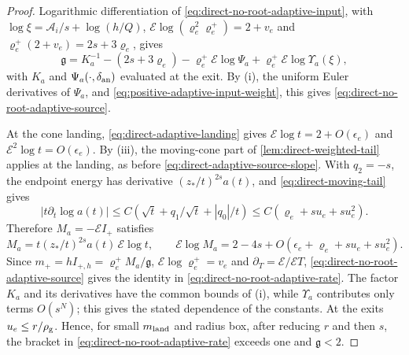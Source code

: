 \begin{proof}
Logarithmic differentiation of \eqref{eq:direct-no-root-adaptive-input},
with \(\log\xi=\mathcal A_i/s+\log(h/Q)\),
\(\mathcal E\log(\varrho_e^2\varrho_e^+)=2+v_e\) and
\(\varrho_e^+(2+v_e)=2s+3\varrho_e\), gives
\[
 \mathfrak g
 =K_a^{-1}-(2s+3\varrho_e)
       -\varrho_e^+\mathcal E\log\Psi_a
       +\varrho_e^+\mathcal E\log\Upsilon_a(\xi),
\]
with \(K_a\) and \(\Psi_a(\cdot,\delta_{\rm an})\) evaluated at the exit.
By (i), the uniform Euler derivatives of \(\Psi_a\), and
\eqref{eq:positive-adaptive-input-weight}, this gives
\eqref{eq:direct-no-root-adaptive-source}.

At the cone landing, \eqref{eq:direct-adaptive-landing} gives
\(\mathcal E\log t=2+O(\epsilon_e)\) and
\(\mathcal E^2\log t=O(\epsilon_e)\). By (iii), the moving-cone
part of \cref{lem:direct-weighted-tail} applies at the landing, as before
\eqref{eq:direct-adaptive-source-slope}. With \(q_2=-s\), the endpoint
energy has derivative \((z_*/t)^{2s}a(t)\), and
\eqref{eq:direct-moving-tail} gives
\[
 |t\partial_t\log a(t)|
   \le C(\sqrt t+q_1/\sqrt t+|q_0|/t)
   \le C(\varrho_e+su_e+su_e^2).
\]
Therefore \(M_a=-\mathcal EI_+\) satisfies
\[
 M_a=t(z_*/t)^{2s}a(t)\,\mathcal E\log t,\qquad
 \mathcal E\log M_a=2-4s+
              O(\epsilon_e+\varrho_e+su_e+su_e^2).
\]
Since \(m_+=hI_{+,h}=\varrho_e^+M_a/\mathfrak g\),
\(\mathcal E\log\varrho_e^+=v_e\) and \(\partial_T=\mathcal E/\mathcal ET\),
\eqref{eq:direct-no-root-adaptive-source} gives the identity in
\eqref{eq:direct-no-root-adaptive-rate}. The factor \(K_a\) and its
derivatives have the common bounds of (i), while \(\Upsilon_a\) contributes
only terms \(O(s^N)\); this gives the stated dependence of the constants.
At the exits \(u_e\le r/\rho_{\rm g}\). Hence, for small \(m_{\rm land}\)
and radius box, after reducing \(r\) and then \(s\), the bracket in
\eqref{eq:direct-no-root-adaptive-rate} exceeds one and \(\mathfrak g<2\).
\end{proof}

